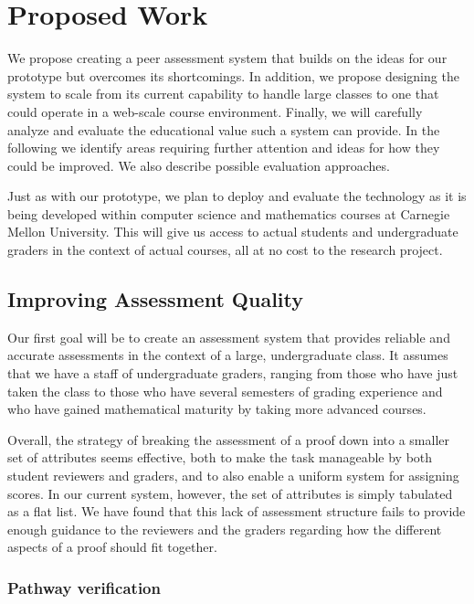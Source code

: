 \documentclass[12pt]{article}
\begin{document}
\section{Proposed Work}

We propose creating a peer assessment system that builds on the ideas
for our prototype but overcomes its shortcomings.  In addition, we
propose designing the system to scale from its current capability to
handle large classes to one that could operate in a web-scale course
environment.  Finally, we will carefully analyze and evaluate the
educational value such a system can provide.  In the following we
identify areas requiring further attention and ideas for how they
could be improved.  We also describe possible evaluation approaches.

Just as with our prototype, we plan to deploy and evaluate
the technology as it is being developed within computer science and
mathematics courses at Carnegie Mellon University.  This will give us
access to actual students and undergraduate graders in the context of
actual courses, all at no cost to the research project.

\subsection{Improving Assessment Quality}

Our first goal will be to create an assessment system that provides
reliable and accurate assessments in the context of a large,
undergraduate class.  It assumes that we have a staff of undergraduate
graders, ranging from those who have just taken the class to those who
have several semesters of grading experience and who have gained
mathematical maturity by taking more advanced courses.

Overall, the strategy of breaking the assessment of a proof down into a smaller
set of attributes seems effective, both to make the task manageable by
both student reviewers and graders, and to also enable a uniform
system for assigning scores.  In our current system, however, the set
of attributes is simply tabulated as a flat list.  We have found that
this lack of assessment structure fails to provide enough guidance to the
reviewers and the graders regarding how the different aspects of a
proof should fit together.

\subsubsection*{Pathway verification}
\end{document}
